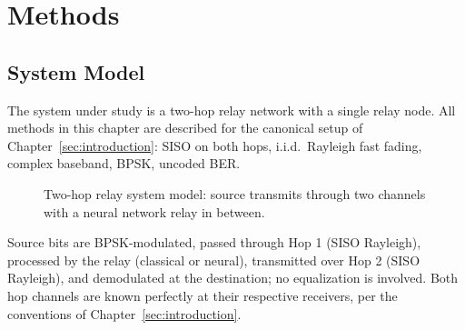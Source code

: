 \chapter{Methods}\label{sec:methods}

\section{System Model}\label{sec:system-model-1}

The system under study is a two-hop relay network with a single relay node. All methods in this chapter are described for the canonical setup of Chapter~\ref{sec:introduction}: SISO on both hops, i.i.d.\ Rayleigh fast fading, complex baseband, BPSK, uncoded BER.


\begin{figure}[H]
\centering
{}
\caption{Two-hop relay system model: source transmits through two channels
         with a neural network relay in between.}
\label{fig:relay-system-simple}
\end{figure}


Source bits are BPSK-modulated, passed through Hop 1 (SISO Rayleigh), processed by the relay (classical or neural), transmitted over Hop 2 (SISO Rayleigh), and demodulated at the destination; no equalization is involved. Both hop channels are known perfectly at their respective receivers, per the conventions of Chapter~\ref{sec:introduction}.

